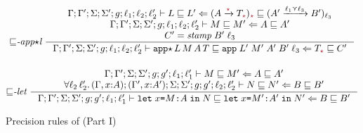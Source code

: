 \begin{figure}[tbp]
{\begin{gather*}
  \\[3ex]
    {\sqsubseteq}\textit{-app${\star}$l}~
    \inference{\precctx{\Gamma}{\Gamma'}{\Sigma}{\Sigma'}{g}{\ell_1}{\ell_2}{\ell_2'}\ccprec{L}{L'}{(\Fun{A}{\unk}{T_{\unk}})_{\unk}}{(\Fun{A'}{\ell_1 \curlyvee \ell_3}{B'})_{\ell_3}} \\
                  \precctx{\Gamma}{\Gamma'}{\Sigma}{\Sigma'}{g}{\ell_1}{\ell_2}{\ell_2'}\ccprec{M}{M'}{A}{A'} \\
                  C' = \mathit{stamp}\;B'\;\ell_3}
              {\precctx{\Gamma}{\Gamma'}{\Sigma}{\Sigma'}{g}{\ell_1}{\ell_2}{\ell_2'}\ccprec{\ccappstar{L}{M}{A}{T}}{\ccapp{L'}{M'}{A'}{B'}{\ell_3}}{T_{\unk}}{C'}}
  \\[3ex]
  {\sqsubseteq}\textit{-let}~
  \inference{\precctx{\Gamma}{\Gamma'}{\Sigma}{\Sigma'}{g}{g'}{\ell_1}{\ell_1'}\ccprec{M}{M'}{A}{A'} \\
  \forall \ell_2\,\ell_2'.\, \precctx{(\Gamma,x{:}A)}{(\Gamma',x{:}A')}{\Sigma}{\Sigma'}{g}{g'}{\ell_2}{\ell_2'}\ccprec{N}{N'}{B}{B'}}
  {\precctx{\Gamma}{\Gamma'}{\Sigma}{\Sigma'}{g}{g'}{\ell_1}{\ell_1'}\ccprec{\cclet{x}{M}{A}{N}}{\cclet{x}{M'}{A'}{N'}}{B}{B'}}
  \end{gather*}}
  \caption{Precision rules of \CC (Part I)}
  \label{fig:cc-prec-1}
\end{figure}

